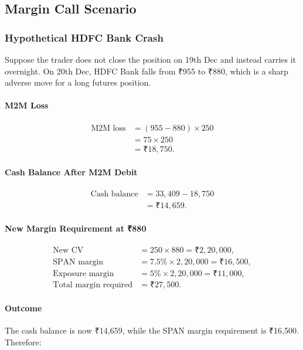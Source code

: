 \documentclass[12pt,openany]{book}
\begin{document}
\subsection{Margin Call Scenario}

\subsubsection{Hypothetical HDFC Bank Crash}
Suppose the trader does not close the position on 19th Dec and instead carries it overnight. On 20th Dec, HDFC Bank falls from ₹955 to ₹880, which is a sharp adverse move for a long futures position.

\paragraph{M2M Loss}
\begin{align*}
\text{M2M loss} &= (955 - 880) \times 250 \\
&= 75 \times 250 \\
&= \text{₹}18{,}750.
\end{align*}

\paragraph{Cash Balance After M2M Debit}
\begin{align*}
\text{Cash balance} &= 33{,}409 - 18{,}750 \\
&= \text{₹}14{,}659.
\end{align*}

\paragraph{New Margin Requirement at ₹880}
\begin{align*}
\text{New CV} &= 250 \times 880 = \text{₹}2{,}20{,}000, \\
\text{SPAN margin} &= 7.5\% \times 2{,}20{,}000 = \text{₹}16{,}500, \\
\text{Exposure margin} &= 5\% \times 2{,}20{,}000 = \text{₹}11{,}000, \\
\text{Total margin required} &= \text{₹}27{,}500.
\end{align*}

\paragraph{Outcome}
The cash balance is now ₹14,659, while the SPAN margin requirement is ₹16,500. Therefore:
\end{document}
